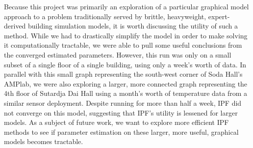 Because this project was primarily an exploration of a particular graphical model approach to a problem traditionally served by brittle, heavyweight, expert-derived building simulation models, it is worth discussing the utility of such a method.
While we had to drastically simplify the model in order to make solving it computationally tractable, we were able to pull some useful conclusions from the converged estimated parameters.
However, this run was only on a small subset of a single floor of a single building, using only a week's worth of data.
In parallel with this small graph representing the south-west corner of Soda Hall's AMPlab, we were also exploring a larger, more connected graph representing the 4th floor of Sutardja Dai Hall using a month's worth of temperature data from a similar sensor deployment.
Despite running for more than half a week, IPF did not converge on this model, suggesting that IPF's utility is lessened for larger models.
As a subject of future work, we want to explore more efficient IPF methods to see if parameter estimation on these larger, more useful, graphical models becomes tractable.
